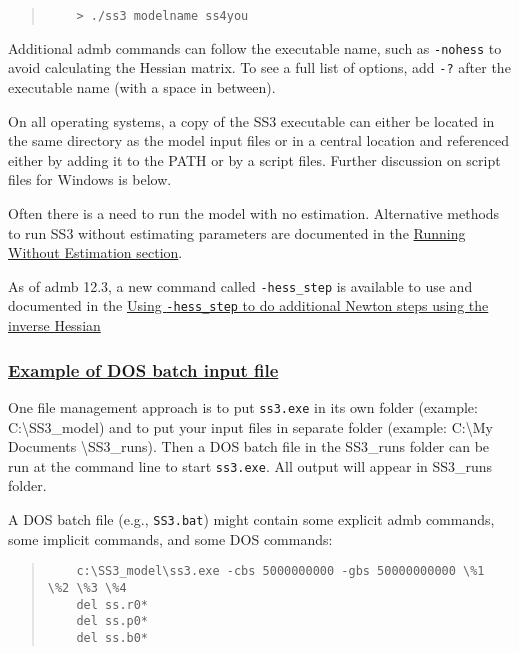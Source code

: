 \begin{quote}
	\begin{verbatim}
	> ./ss3 modelname ss4you
	\end{verbatim}
\end{quote}

Additional \gls{admb} commands can follow the executable name, such as \texttt{-nohess} to avoid calculating the Hessian matrix. To see a full list of options, add \texttt{-?} after the executable name (with a space in between).

On all operating systems, a copy of the SS3 executable can either be located in the same directory as the model input files or in a central location and referenced either by adding it to the PATH or by a script files. Further discussion on script files for Windows is below.

Often there is a need to run the model with no estimation. Alternative methods to run SS3 without estimating parameters are documented in the \hyperlink{NoEst}{Running Without Estimation section}. 

As of \gls{admb} 12.3, a new command called \texttt{-hess\_step} is available to use and documented in the \hyperlink{hess-step}{Using \texttt{-hess\_step} to do additional Newton steps using the inverse Hessian}

\hypertarget{DOS}{}
\subsubsection[Example of DOS batch input file]{\protect\hyperlink{DOS}{Example of DOS batch input file}}
One file management approach is to put \texttt{ss3.exe} in its own folder (example:  C:\textbackslash SS3\_model) and to put your input files in separate folder (example:  C:\textbackslash My Documents \textbackslash SS3\_runs). Then a DOS batch file in the SS3\_runs folder can be run at the command line to start \texttt{ss3.exe}. All output will appear in SS3\_runs folder.

A DOS batch file (e.g., \texttt{SS3.bat}) might contain some explicit \gls{admb} commands, some implicit commands, and some DOS commands:

\begin{quote}
	\begin{verbatim}
	c:\SS3_model\ss3.exe -cbs 5000000000 -gbs 50000000000 \%1 \%2 \%3 \%4 
	del ss.r0*
	del ss.p0*
	del ss.b0*
	\end{verbatim}
\end{quote}


